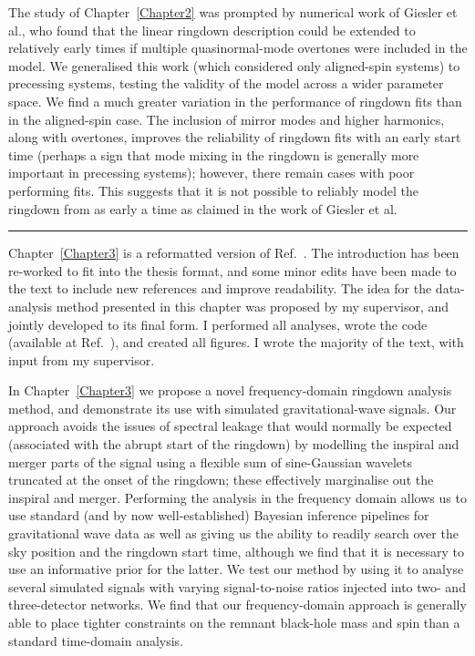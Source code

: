 \documentclass[
12pt, %
english, %
doublespacing, %
headsepline, %
]{MastersDoctoralThesis} %
\begin{document}
\vspace{0.2cm}

\noindent The study of Chapter~\ref{Chapter2} was prompted by numerical work of Giesler et al., who found that the linear ringdown description could be extended to relatively early times if multiple quasinormal-mode overtones were included in the model.
We generalised this work (which considered only aligned-spin systems) to precessing systems, testing the validity of the model across a wider parameter space.
We find a much greater variation in the performance of ringdown fits than in the aligned-spin case. 
The inclusion of mirror modes and higher harmonics, along with overtones, improves the reliability of ringdown fits with an early start time (perhaps a sign that mode mixing in the ringdown is generally more important in precessing systems); however, there remain cases with poor performing fits.
This suggests that it is not possible to reliably model the ringdown from as early a time as claimed in the work of Giesler et al.

\begin{center}
    \rule[.5ex]{.5\textwidth}{.5pt}
\end{center}

\noindent Chapter~\ref{Chapter3} is a reformatted version of Ref.~\cite{Finch:2021qph}. 
The introduction has been re-worked to fit into the thesis format, and some minor edits have been made to the text to include new references and improve readability. 
The idea for the data-analysis method presented in this chapter was proposed by my supervisor, and jointly developed to its final form.
I performed all analyses, wrote the code (available at Ref.~\cite{fdringdown}), and created all figures. 
I wrote the majority of the text, with input from my supervisor.

\vspace{0.2cm}

\noindent In Chapter~\ref{Chapter3} we propose a novel frequency-domain ringdown analysis method, and demonstrate its use with simulated gravitational-wave signals.
Our approach avoids the issues of spectral leakage that would normally be expected (associated with the abrupt start of the ringdown) by modelling the inspiral and merger parts of the signal using a flexible sum of sine-Gaussian wavelets truncated at the onset of the ringdown; these effectively marginalise out the inspiral and merger.
Performing the analysis in the frequency domain allows us to use standard (and by now well-established) Bayesian inference pipelines for gravitational wave data as well as giving us the ability to readily search over the sky position and the ringdown start time, although we find that it is necessary to use an informative prior for the latter. 
We test our method by using it to analyse several simulated signals with varying signal-to-noise ratios injected into two- and three-detector networks. 
We find that our frequency-domain approach is generally able to place tighter constraints on the remnant black-hole mass and spin than a standard time-domain analysis.
\end{document}

